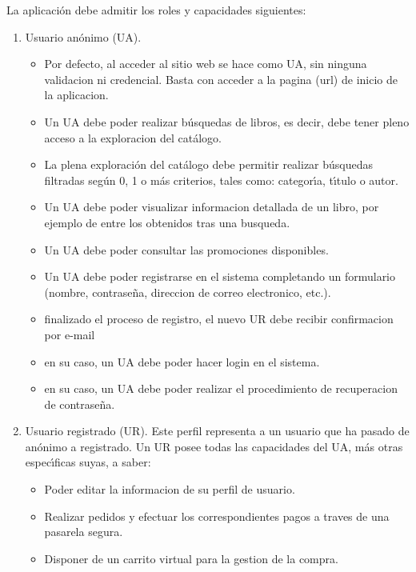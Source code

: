 \documentclass[a4paper]{report}
\begin{document}
            La aplicación debe admitir los roles y capacidades siguientes:
            \begin{enumerate}
                \item Usuario an\'onimo (UA).
                \begin{itemize}
                    \item Por defecto, al acceder al sitio web se hace como UA, sin ninguna validacion ni credencial. Basta con acceder a la pagina (url) de inicio de la aplicacion.
                    \item Un UA debe poder realizar b\'usquedas de libros, es decir, debe tener pleno acceso a la exploracion del cat\'alogo.
                    \item La plena exploraci\'on del cat\'alogo debe permitir realizar b\'usque\-das filtradas seg\'un 0, 1 o m\'as criterios, tales como: categor\'\i{}a, t\'\i{}tulo o autor.
                    \item Un UA debe poder visualizar informacion detallada de un libro, por ejemplo de entre los obtenidos tras una busqueda.
                    \item Un UA debe poder consultar las promociones disponibles.
                    \item Un UA debe poder registrarse en el sistema completando un formulario (nombre, contrase\~na, direccion de correo electronico, etc.).
                    \item finalizado el proceso de registro, el nuevo UR debe recibir confirmacion por e-mail
                    \item en su caso, un UA debe poder hacer login en el sistema.
                    \item en su caso, un UA debe poder realizar el procedimiento de recuperacion de contrase\~na.
                \end{itemize}
                \item Usuario registrado (UR). Este perfil representa a un usuario que ha pasado de an\'onimo a registrado. Un UR posee todas las capacidades del UA, m\'as otras espec\'\i{}ficas suyas, a saber:
                \begin{itemize}
                    \item Poder editar la informacion de su perfil de usuario.
                    \item Realizar pedidos y efectuar los correspondientes pagos a traves de una pasarela segura.
                    \item Disponer de un carrito virtual para la gestion de la compra.

\end{itemize}
\end{enumerate}
\end{document}
